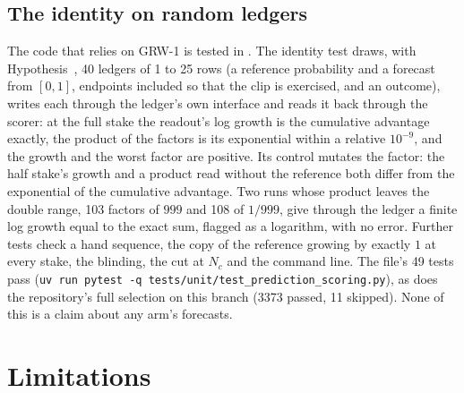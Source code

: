 \documentclass[11pt]{article}
\theoremstyle{plain}
\theoremstyle{definition}
\theoremstyle{remark}
\begin{document}
\subsection{The identity on random ledgers}

The code that relies on GRW-1 is tested in . The
identity test draws, with Hypothesis~\citep{maciver2019}, 40 ledgers of 1 to 25 rows (a reference
probability and a forecast from $[0,1]$, endpoints included so that the clip is exercised, and an
outcome), writes each through the ledger's own interface and reads it back through the scorer: at
the full stake the readout's log growth is the cumulative advantage exactly, the product of the
factors is its exponential within a relative $10^{-9}$, and the growth and the worst factor are
positive. Its control mutates the factor: the half stake's growth and a product read without the
reference both differ from the exponential of the cumulative advantage. Two runs whose product
leaves the double range, 103 factors of $999$ and 108 of $1/999$, give through the ledger a finite
log growth equal to the exact sum, flagged as a logarithm, with no error. Further tests check a hand
sequence, the copy of the reference growing by exactly $1$ at every stake, the blinding, the cut at
$N_c$ and the command line. The file's 49 tests pass (\texttt{uv run pytest -q
tests/unit/test\_prediction\_scoring.py}), as does the repository's full selection on this branch
(3373 passed, 11 skipped). None of this is a claim about any arm's forecasts.

\section{Limitations}
\label{sec:limitations}
\end{document}
